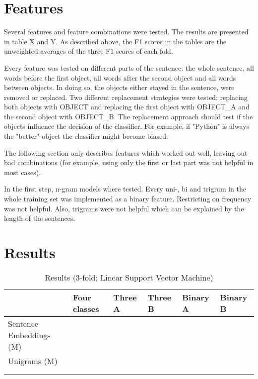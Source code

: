 \section{Features}
Several features and feature combinations were tested. The results are presented in table X and Y. As described above, the F1 scores in the tables are the unweighted averages of the three F1 scores of each fold.

Every feature was tested on different parts of the sentence: the whole sentence, all words before the first object, all words after the second object and all words between objects. In doing so, the objects either stayed in the sentence, were removed or replaced. Two different replacement strategies were tested: replacing both objects with OBJECT and replacing the first object with OBJECT\_A and the second object with OBJECT\_B. The replacement approach should test if the objects influence the decision of the classifier. For example, if "Python" is always the "better" object the classifier might become biased.

The following section only describes features which worked out well, leaving out bad combinations (for example, using only the first or last part was not helpful in most cases).\newline

In the first step, n-gram models where tested. Every uni-, bi and trigram in the whole training set was implemented as a binary feature. Restricting on frequency was not helpful. Also, trigrams were not helpful which can be explained by the length of the sentences.



\section{Results}

\begin{table}[h]
\centering
\caption{Results (3-fold; Linear Support Vector Machine)}
\label{tbl:results}
\begin{tabularx}{\textwidth}{lXXXXX}
\toprule
                            & Four classes &Three A & Three B & Binary A & Binary B \\ \midrule
Sentence Embeddings (M) &              &               &              &                &             \\
Unigrams (M)            &              &               &              &                &             \\ \midrule
                            &              &               &              &                &             \\
                            &              &               &              &                &             \\ \bottomrule
\end{tabularx}
\end{table}
